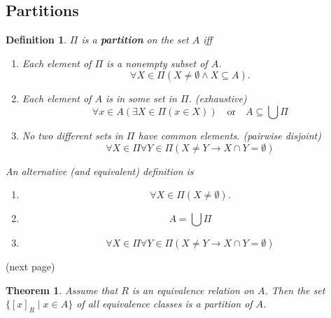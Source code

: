 \documentclass{report}
\newtheorem{theorem}[theo]{Theorem}
\newtheorem{definition}[theo]{Definition}
\begin{document}
\subsection{Partitions}
\begin{definition}
$\Pi$ is a \textbf{partition} on the set $A$ iff
\begin{enumerate}
\item Each element of $\Pi$ is a nonempty subset of $A$.
\begin{equation*}
\forall X\in\Pi(X\neq\emptyset\land X\subseteq A).
\end{equation*}
\item Each element of $A$ is in some set in $\Pi$. (exhaustive)
\begin{equation*}
\forall x\in A(\exists X\in\Pi(x\in X))\quad\text{or}\quad A\subseteq\bigcup\Pi
\end{equation*}
\item No two different sets in $\Pi$ have common elements. (pairwise disjoint)
\begin{equation*}
\forall X\in\Pi\forall Y\in\Pi(X\neq Y\to X\cap Y=\emptyset)
\end{equation*}
\end{enumerate}
An alternative (and equivalent) definition is
\begin{enumerate}
\item
\begin{equation*}
\forall X\in\Pi(X\neq\emptyset).
\end{equation*}
\item 
\begin{equation*}
A=\bigcup\Pi
\end{equation*}
\item
\begin{equation*}
\forall X\in\Pi\forall Y\in\Pi(X\neq Y\to X\cap Y=\emptyset)
\end{equation*}
\end{enumerate}
\end{definition}
\noindent(next page)\newpage
\begin{theorem}
Assume that $R$ is an equivalence relation on $A$. Then the set $\{[x]_R\mid x\in A\}$ of all equivalence classes is a partition of $A$.
\end{theorem}
\end{document}
